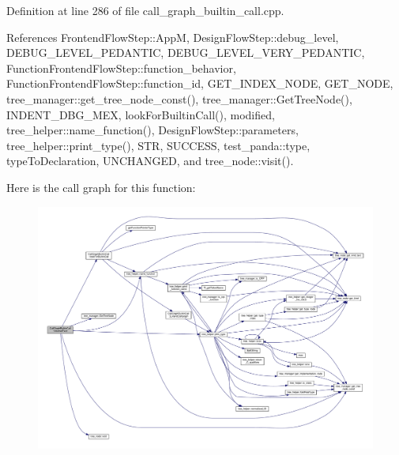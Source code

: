 Definition at line 286 of file call\+\_\+graph\+\_\+builtin\+\_\+call.\+cpp.



References Frontend\+Flow\+Step\+::\+AppM, Design\+Flow\+Step\+::debug\+\_\+level, D\+E\+B\+U\+G\+\_\+\+L\+E\+V\+E\+L\+\_\+\+P\+E\+D\+A\+N\+T\+IC, D\+E\+B\+U\+G\+\_\+\+L\+E\+V\+E\+L\+\_\+\+V\+E\+R\+Y\+\_\+\+P\+E\+D\+A\+N\+T\+IC, Function\+Frontend\+Flow\+Step\+::function\+\_\+behavior, Function\+Frontend\+Flow\+Step\+::function\+\_\+id, G\+E\+T\+\_\+\+I\+N\+D\+E\+X\+\_\+\+N\+O\+DE, G\+E\+T\+\_\+\+N\+O\+DE, tree\+\_\+manager\+::get\+\_\+tree\+\_\+node\+\_\+const(), tree\+\_\+manager\+::\+Get\+Tree\+Node(), I\+N\+D\+E\+N\+T\+\_\+\+D\+B\+G\+\_\+\+M\+EX, look\+For\+Builtin\+Call(), modified, tree\+\_\+helper\+::name\+\_\+function(), Design\+Flow\+Step\+::parameters, tree\+\_\+helper\+::print\+\_\+type(), S\+TR, S\+U\+C\+C\+E\+SS, test\+\_\+panda\+::type, type\+To\+Declaration, U\+N\+C\+H\+A\+N\+G\+ED, and tree\+\_\+node\+::visit().

Here is the call graph for this function\+:
\nopagebreak
\begin{figure}[H]
\begin{center}
\leavevmode
\includegraphics[width=350pt]{d6/da0/classCallGraphBuiltinCall_a6c31ba7314cedc5026d47cb1c5b967ed_cgraph}
\end{center}
\end{figure}
\mbox{\label{classCallGraphBuiltinCall_a3c3f8ffb197a72edd1ea375b7ffa5d1d}} 
